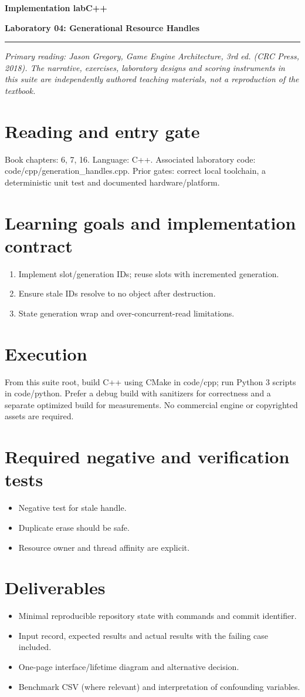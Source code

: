\documentclass[11pt,letterpaper]{article}
\newcommand{\DocType}{Reference}
\newcommand{\SuiteHeading}[3]{%
\renewcommand{\DocType}{#2}%
{\small\bfseries\sffamily\color{EngineTeal}#2\hfill #3}\par\vspace{6pt}
{\LARGE\bfseries\color{EngineBlue}#1}\par\vspace{4pt}
{\color{EngineTeal}\rule{\linewidth}{1pt}}\par\vspace{7pt}}
\newcommand{\SourceNote}{\footnotesize\textit{Primary reading: Jason Gregory, \emph{Game Engine Architecture}, 3rd ed. (CRC Press, 2018). The narrative, exercises, laboratory designs and scoring instruments in this suite are independently authored teaching materials, not a reproduction of the textbook.}\normalsize\par}
\begin{document}
\SuiteHeading{Laboratory 04: Generational Resource Handles}{Implementation lab}{C++}
\SourceNote
\section{Reading and entry gate}
Book chapters: 6, 7, 16. Language: C++. Associated laboratory code: code/cpp/generation\_handles.cpp. Prior gates: correct local toolchain, a deterministic unit test and documented hardware/platform.

\section{Learning goals and implementation contract}
\begin{enumerate}
\item Implement slot/generation IDs; reuse slots with incremented generation.
\item Ensure stale IDs resolve to no object after destruction.
\item State generation wrap and over-concurrent-read limitations.
\end{enumerate}
\section{Execution}
From this suite root, build C++ using CMake in code/cpp; run Python 3 scripts in code/python. Prefer a debug build with sanitizers for correctness and a separate optimized build for measurements. No commercial engine or copyrighted assets are required.

\section{Required negative and verification tests}
\begin{itemize}
\item Negative test for stale handle.
\item Duplicate erase should be safe.
\item Resource owner and thread affinity are explicit.
\end{itemize}
\section{Deliverables}
\begin{itemize}
\item Minimal reproducible repository state with commands and commit identifier.
\item Input record, expected results and actual results with the failing case included.
\item One-page interface/lifetime diagram and alternative decision.
\item Benchmark CSV (where relevant) and interpretation of confounding variables.
\end{itemize}
\end{document}
